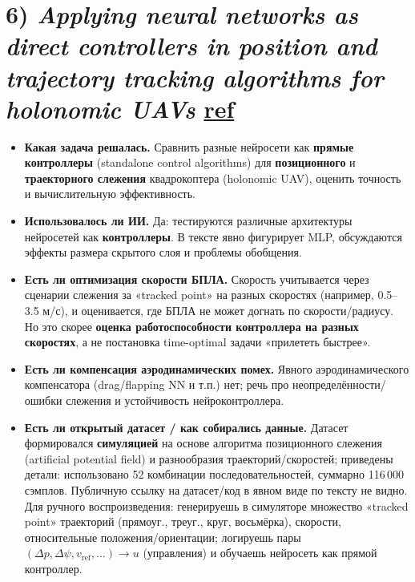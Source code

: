 \section*{6) \textit{Applying neural networks as direct controllers in position and trajectory tracking algorithms for holonomic UAVs} \href{https://pmc.ncbi.nlm.nih.gov/articles/PMC11993649/#Abs1}{ref}}
\begin{itemize}
  \item \textbf{Какая задача решалась.}
  Сравнить разные нейросети как \textbf{прямые контроллеры} (standalone control algorithms) для \textbf{позиционного} и \textbf{траекторного слежения} квадрокоптера (holonomic UAV), оценить точность и вычислительную эффективность.

  \item \textbf{Использовалось ли ИИ.}
  Да: тестируются различные архитектуры нейросетей как \textbf{контроллеры}. В тексте явно фигурирует MLP, обсуждаются эффекты размера скрытого слоя и проблемы обобщения.

  \item \textbf{Есть ли оптимизация скорости БПЛА.}
  Скорость учитывается через сценарии слежения за «tracked point» на разных скоростях (например, 0.5--3.5 м/с), и оценивается, где БПЛА не может догнать по скорости/радиусу. Но это скорее \textbf{оценка работоспособности контроллера на разных скоростях}, а не постановка time-optimal задачи «прилететь быстрее».

  \item \textbf{Есть ли компенсация аэродинамических помех.}
  Явного аэродинамического компенсатора (drag/flapping NN и т.п.) нет; речь про неопределённости/ошибки слежения и устойчивость нейроконтроллера.

  \item \textbf{Есть ли открытый датасет / как собирались данные.}
  Датасет формировался \textbf{симуляцией} на основе алгоритма позиционного слежения (artificial potential field) и разнообразия траекторий/скоростей; приведены детали: использовано 52 комбинации последовательностей, суммарно 116\,000 сэмплов. Публичную ссылку на датасет/код в явном виде по тексту не видно.
  Для ручного воспроизведения: генерируешь в симуляторе множество «tracked point» траекторий (прямоуг., треуг., круг, восьмёрка), скорости, относительные положения/ориентации; логируешь пары
  $(\Delta p, \Delta \psi, v_\text{ref}, \ldots)\to u$
  (управления) и обучаешь нейросеть как прямой контроллер.
\end{itemize}

